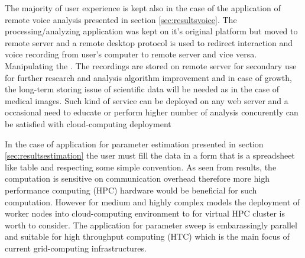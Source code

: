

 
The majority of user experience is kept also in the case of the application of remote voice analysis presented in section \ref{sec:resultsvoice}. The processing/analyzing application was kept on it's original platform but moved to remote server and a remote desktop protocol is used to redirect interaction and voice recording from user's computer to remote server and vice versa. Manipulating the . The recordings are stored on remote server for secondary use for further research and analysis algorithm improvement and in case of growth, the long-term storing issue of scientific data will be needed as in the case of medical images. Such kind of service can be deployed on any web server and a occasional need to educate or perform higher number of analysis concurently can be satisfied with cloud-computing deployment 

In the case of application for parameter estimation presented in section \ref{sec:resultsestimation} the user must fill the data in a form that is a spreadsheet like table and respecting some simple convention. As seen from results, the computation is sensitive on communication overhead therefore more high performance computing (HPC) hardware would be beneficial for such computation. However for medium and highly complex models the deployment of worker nodes into cloud-computing environment to for virtual HPC cluster is worth to consider. The application for parameter sweep is embarassingly parallel and suitable for high throughput computing (HTC) which is the main focus of current grid-computing infrastructures.   


